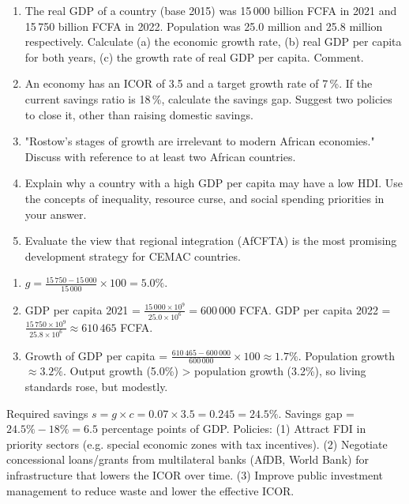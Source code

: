 \documentclass[11pt]{article}
\begin{document}
\begin{exercice}
\begin{enumerate}
\item The real GDP of a country (base 2015) was 15\,000 billion FCFA in 2021 and 15\,750 billion FCFA in 2022. Population was 25.0 million and 25.8 million respectively. Calculate (a) the economic growth rate, (b) real GDP per capita for both years, (c) the growth rate of real GDP per capita. Comment.
\item An economy has an ICOR of 3.5 and a target growth rate of 7\,\%. If the current savings ratio is 18\,\%, calculate the savings gap. Suggest two policies to close it, other than raising domestic savings.
\item "Rostow's stages of growth are irrelevant to modern African economies." Discuss with reference to at least two African countries.
\item Explain why a country with a high GDP per capita may have a low HDI. Use the concepts of inequality, resource curse, and social spending priorities in your answer.
\item Evaluate the view that regional integration (AfCFTA) is the most promising development strategy for CEMAC countries.
\end{enumerate}
\end{exercice}

\begin{corrige}[Exercise 1]
\begin{enumerate}
\item[(a)] $g = \frac{15\,750 - 15\,000}{15\,000} \times 100 = 5.0\%$.
\item[(b)] GDP per capita 2021 = $\frac{15\,000 \times 10^9}{25.0 \times 10^6} = 600\,000$ FCFA. GDP per capita 2022 = $\frac{15\,750 \times 10^9}{25.8 \times 10^6} \approx 610\,465$ FCFA.
\item[(c)] Growth of GDP per capita = $\frac{610\,465 - 600\,000}{600\,000} \times 100 \approx 1.7\%$. Population growth $\approx 3.2\%$. Output growth (5.0\%) > population growth (3.2\%), so living standards rose, but modestly.
\end{enumerate}
\end{corrige}

\begin{corrige}[Exercise 2]
Required savings $s = g \times c = 0.07 \times 3.5 = 0.245 = 24.5\%$. Savings gap = $24.5\% - 18\% = 6.5$ percentage points of GDP.
Policies: (1) Attract FDI in priority sectors (e.g. special economic zones with tax incentives). (2) Negotiate concessional loans/grants from multilateral banks (AfDB, World Bank) for infrastructure that lowers the ICOR over time. (3) Improve public investment management to reduce waste and lower the effective ICOR.
\end{corrige}
\end{document}
